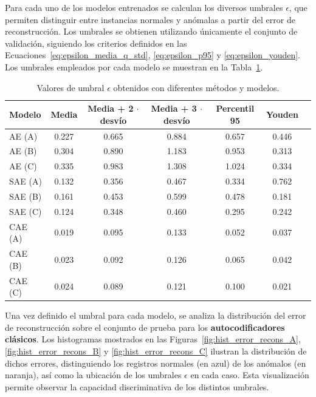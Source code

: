 \documentclass[a4paper,10pt]{book}
\begin{document}
Para cada uno de los modelos entrenados se calculan los diversos umbrales 
$\epsilon$, que permiten distinguir entre instancias normales y anómalas a partir del error de reconstrucción. Los umbrales se obtienen utilizando únicamente el conjunto de validación, siguiendo los criterios definidos en las Ecuaciones~\ref{eq:epsilon_media_q_std}, \ref{eq:epsilon_p95} y \ref{eq:epsilon_youden}. Los umbrales empleados por cada modelo se muestran en la Tabla~\ref{tab:epsilons_modelos}.
\begin{table}[H]
	\centering
	\caption{Valores de umbral $\epsilon$ obtenidos con diferentes métodos y modelos.}
	\label{tab:epsilons_modelos}
	\begin{tabular}{lcccccc}
		\toprule
		\textbf{Modelo} &
		\textbf{Media} &
		\textbf{Media + 2} $\cdot$ \textbf{desvío} &
		\textbf{Media + 3} $\cdot$ \textbf{desvío} &
		\textbf{Percentil 95} &
		\textbf{Youden} \\
		\midrule
		AE (A)  & 0.227 & 0.665 & 0.884 & 0.657 & 0.446 \\
		AE (B)  & 0.304 & 0.890 & 1.183 & 0.953 & 0.313 \\
		AE (C)  & 0.335 & 0.983 & 1.308 & 1.024 & 0.334 \\
		\midrule
		SAE (A) & 0.132 & 0.356 & 0.467 & 0.334 & 0.762 \\
		SAE (B) & 0.161 & 0.453 & 0.599 & 0.478 & 0.181 \\
		SAE (C) & 0.124 & 0.348 & 0.460 & 0.295 & 0.242 \\
		\midrule
		CAE (A) & 0.019 & 0.095 & 0.133 & 0.052 & 0.037 \\
		CAE (B) & 0.023 & 0.092 & 0.126 & 0.065 & 0.042 \\
		CAE (C) & 0.024 & 0.089 & 0.121 & 0.100 & 0.021 \\
		\bottomrule
	\end{tabular}
\end{table}

Una vez definido el umbral para cada modelo, se analiza la distribución del error de reconstrucción sobre el conjunto de prueba para los \textbf{autocodificadores clásicos}. Los histogramas mostrados en las Figuras~\ref{fig:hist_error_recons_A}, \ref{fig:hist_error_recons_B} y \ref{fig:hist_error_recons_C} ilustran la distribución de dichos errores, distinguiendo los registros normales (en azul) de los anómalos (en naranja), así como la ubicación de los umbrales $\epsilon$ en cada caso. Esta visualización permite observar la capacidad discriminativa de los distintos umbrales.
\end{document}
